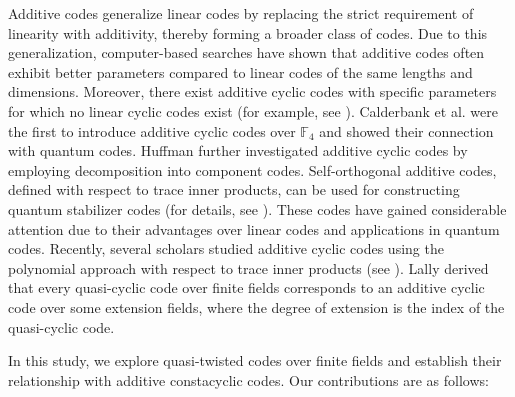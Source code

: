 \documentclass[12 pt]{extarticle}
\numberwithin{equation}{section}
\theoremstyle{definition}
\begin{document}
Additive codes generalize linear codes by replacing the strict requirement of linearity with additivity, thereby forming a broader class of codes. Due to this generalization, computer-based searches have shown that additive codes often exhibit better parameters compared to linear codes of the same lengths and dimensions. Moreover, there exist additive cyclic codes with specific parameters for which no linear cyclic codes exist (for example, see \cite{Verma2024}). Calderbank et al. \cite{calderbank1998} were the first to introduce additive cyclic codes over $\mathbb{F}_4$ and showed their connection with quantum codes. Huffman \cite{huffman2007,huffman2010} further investigated additive cyclic codes by employing decomposition into component codes. Self-orthogonal additive codes, defined with respect to trace inner products, can be used for constructing quantum stabilizer codes (for details, see \cite{ketkar2006}). These codes have gained considerable attention due to their advantages over linear codes and applications in quantum codes. Recently, several scholars studied additive cyclic codes using the polynomial approach with respect to trace inner products (see \cite{choi2023,reza2025,shi2022,shi2024,Verma2024}). Lally \cite{lally2003} derived that every quasi-cyclic code over finite fields corresponds to an additive cyclic code over some extension fields, where the degree of extension is the index of the quasi-cyclic code. 

In this study, we explore quasi-twisted codes over finite fields and establish their relationship with additive constacyclic codes. Our contributions are as follows:
\end{document}
